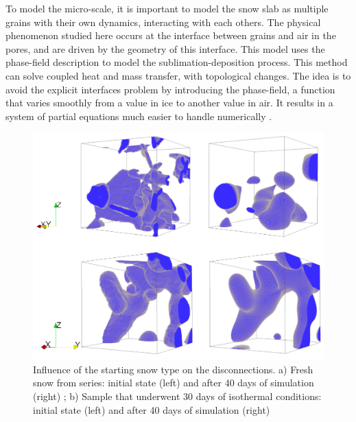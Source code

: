 \documentclass[draft,ms]{agujournal2019}
\begin{document}
To model the micro-scale, it is important to model the snow slab as multiple grains with their own dynamics, interacting with each others. The physical phenomenon studied here occurs at the interface between grains and air in the pores, and are driven by the geometry of this interface. This model uses the phase-field description to model the sublimation-deposition process. This method can solve coupled heat and mass transfer, with topological changes. The idea is to avoid the explicit interfaces problem by introducing the phase-field, a function that varies smoothly from a value in ice to another value in air. It results in a system of partial equations much easier to handle numerically \cite{bretin_and_denis_discrete-continuous_2015, kaempfer_phase-field_2009}.

\begin{figure}
    \centering
    \includegraphics[width=0.7\linewidth]{Figures/disconnections_iso01_iso15.pdf}
    \caption{Influence of the starting snow type on the disconnections. a) Fresh snow from \protect\cite{flin_three-dimensional_2004} series: initial state (left) and after 40 days of simulation (right) ; b) Sample that underwent 30 days of isothermal conditions: initial state (left) and after 40 days of simulation (right) }
    \label{fig:disco}
\end{figure}
\end{document}
